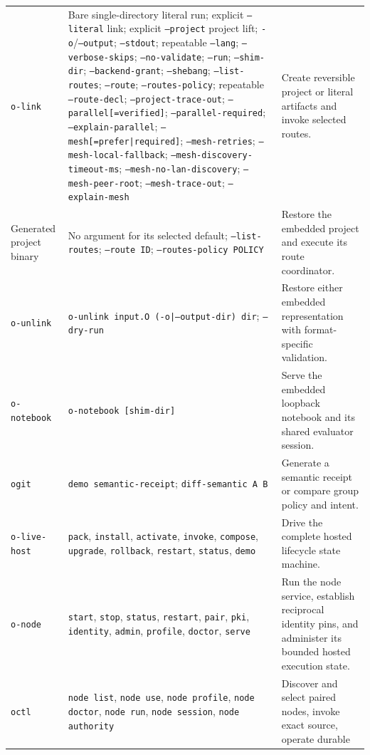 \documentclass[11pt,oneside]{article}
\begin{document}
\begin{longtable}{P{0.18\textwidth} P{0.42\textwidth} P{0.32\textwidth}}
\texttt{o-link} & Bare single-directory literal run; explicit
\texttt{--literal} link; explicit \texttt{--project} project lift;
\texttt{-o}/\texttt{--output};
\texttt{--stdout}; repeatable \texttt{--lang}; \texttt{--verbose-skips};
\texttt{--no-validate}; \texttt{--run}; \texttt{--shim-dir};
\texttt{--backend-grant}; \texttt{--shebang};
\texttt{--list-routes}; \texttt{--route}; \texttt{--routes-policy};
repeatable \texttt{--route-decl}; \texttt{--project-trace-out};
\texttt{--parallel[=verified]}; \texttt{--parallel-required};
\texttt{--explain-parallel}; \texttt{--mesh[=prefer|required]};
\texttt{--mesh-retries}; \texttt{--mesh-local-fallback};
\texttt{--mesh-discovery-timeout-ms}; \texttt{--mesh-no-lan-discovery};
\texttt{--mesh-peer-root}; \texttt{--mesh-trace-out};
\texttt{--explain-mesh} &
Create reversible project or literal artifacts and invoke selected routes. \\
Generated project binary & No argument for its selected default;
\texttt{--list-routes}; \texttt{--route ID}; \texttt{--routes-policy POLICY} &
Restore the embedded project and execute its route coordinator. \\
\texttt{o-unlink} & \texttt{o-unlink input.O
(-o|--output-dir) dir}; \texttt{--dry-run} &
Restore either embedded representation with format-specific validation. \\
\texttt{o-notebook} & \texttt{o-notebook [shim-dir]} &
Serve the embedded loopback notebook and its shared evaluator session. \\
\texttt{ogit} & \texttt{demo semantic-receipt}; \texttt{diff-semantic A B} &
Generate a semantic receipt or compare group policy and intent. \\
\texttt{o-live-host} & \texttt{pack}, \texttt{install}, \texttt{activate},
\texttt{invoke}, \texttt{compose}, \texttt{upgrade}, \texttt{rollback},
\texttt{restart}, \texttt{status}, \texttt{demo} &
Drive the complete hosted lifecycle state machine. \\
\texttt{o-node} & \texttt{start}, \texttt{stop}, \texttt{status},
\texttt{restart}, \texttt{pair}, \texttt{pki}, \texttt{identity},
\texttt{admin}, \texttt{profile}, \texttt{doctor}, \texttt{serve} &
Run the node service, establish reciprocal identity pins, and administer its
bounded hosted execution state. \\
\texttt{octl} & \texttt{node list}, \texttt{node use},
\texttt{node profile}, \texttt{node doctor}, \texttt{node run},
\texttt{node session}, \texttt{node authority} &
Discover and select paired nodes, invoke exact source, operate durable

\end{longtable}
\end{document}
